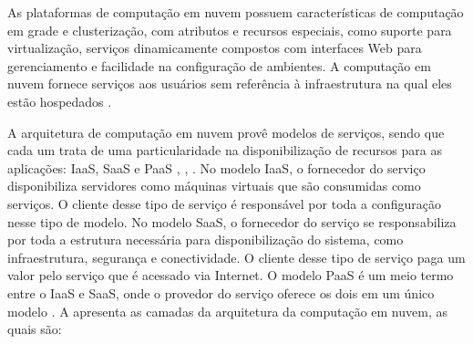 As plataformas de computação em nuvem possuem características de computação em grade e clusterização, com atributos e recursos especiais, como suporte para virtualização, serviços dinamicamente compostos com interfaces Web para gerenciamento e facilidade na configuração de ambientes. A computação em nuvem fornece serviços aos usuários sem referência à infraestrutura na qual eles estão hospedados \cite{Buyya2009}. 


A arquitetura de computação em nuvem provê modelos de serviços, sendo que cada um trata de uma particularidade na disponibilização de recursos para as aplicações: \acrfull{IaaS}, \acrfull{SaaS} e \acrfull{PaaS} \cite{Zhang2010}, \cite{Jadeja2012}, \cite{Puthal2015}. No modelo \acrshort{IaaS}, o fornecedor do serviço disponibiliza servidores como máquinas virtuais que são consumidas como serviços. O cliente desse tipo de serviço é responsável por toda a configuração nesse tipo de modelo. No modelo \acrshort{SaaS}, o fornecedor do serviço se responsabiliza por toda a estrutura necessária para disponibilização do sistema, como infraestrutura, segurança e conectividade. O cliente desse tipo de serviço paga um valor pelo serviço que é acessado via Internet. O modelo \acrshort{PaaS} é um meio termo entre o \acrshort{IaaS} e \acrshort{SaaS}, onde o provedor do serviço oferece os dois em um único modelo \cite{Buyya2009}. A  apresenta as camadas da arquitetura da computação em nuvem, as quais são:


